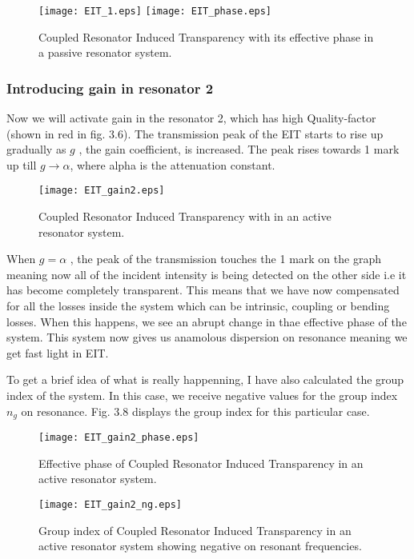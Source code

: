 \begin{figure}[h]
\texttt{[image: EIT\_1.eps]}
\texttt{[image: EIT\_phase.eps]}
\caption{Coupled Resonator Induced Transparency with its effective phase in a passive resonator system.}
\end{figure}

\subsubsection{Introducing gain in resonator 2}
Now we will activate gain in the resonator 2, which has high Quality-factor (shown in red in fig. 3.6). The transmission peak of the EIT starts to rise up gradually as $g$ , the gain coefficient, is increased. The peak rises towards 1 mark up till $g \to \alpha$, where alpha is the attenuation constant. 

\begin{figure}[h]
\centering
\texttt{[image: EIT\_gain2.eps]}
\caption{Coupled Resonator Induced Transparency with in an active resonator system.}
\end{figure}

When $g = \alpha$ , the peak of the transmission touches the 1 mark on the graph meaning now all of the incident intensity is being detected on the other side i.e it has become completely transparent. This means that we have now compensated for all the losses inside the system which can be intrinsic, coupling or bending losses. When this happens, we see an abrupt change in thae effective phase of the system. This system now gives us anamolous dispersion on resonance meaning we get fast light in EIT. 

To get a brief idea of what is really happenning, I have also calculated the group index of the system. In this case, we receive negative values for the group index $n_{g}$ on resonance. Fig. 3.8 displays the group index for this particular case.


\begin{figure}[t]
\centering
\texttt{[image: EIT\_gain2\_phase.eps]}
\caption{Effective phase of Coupled Resonator Induced Transparency  in an active resonator system.}
\end{figure}

 	
\begin{figure}[h]
\centering
\texttt{[image: EIT\_gain2\_ng.eps]}
\caption{Group index of Coupled Resonator Induced Transparency  in an active resonator system showing negative on resonant frequencies.}
\end{figure}
\newpage

